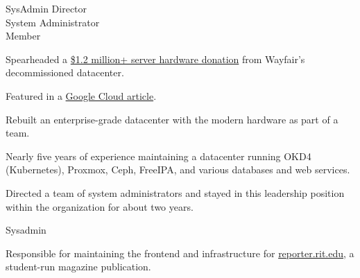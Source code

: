 \vspace{1.5pt} %


\cvtag{\LaTeX}

\smallskip


{
{SysAdmin Director}    \\
{System Administrator} \\
{Member}               \\
}
{
\item{Spearheaded a \href{https://www.rit.edu/news/wayfair-gifts-850000-servers-rits-computer-science-house}{\$1.2 million+ server hardware donation} from Wayfair's decommissioned datacenter.}
\item{Featured in a \href{https://cloud.google.com/blog/transform/wayfair-server-donation-mass-open-cloud-rit-student-innovation-johonnot}{Google Cloud article}.}
\item{Rebuilt an enterprise-grade datacenter with the modern hardware as part of a team.}
\item{Nearly five years of experience maintaining a datacenter running OKD4 (Kubernetes), Proxmox, Ceph, FreeIPA, and various databases and web services.}
\item{Directed a team of system administrators and stayed in this leadership position within the organization for about two years.}
}

{
  {Sysadmin} \\
}
{
  \item{Responsible for maintaining the frontend and infrastructure for \href{https://reporter.rit.edu}{reporter.rit.edu}, a student-run magazine publication.}
}

